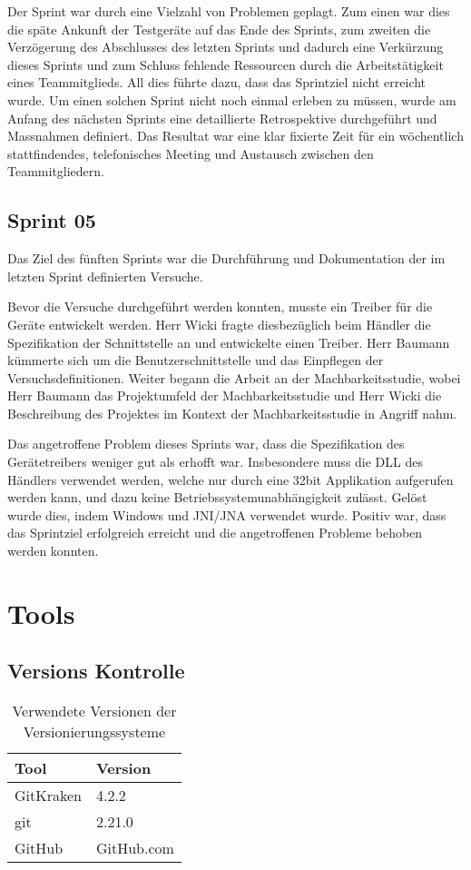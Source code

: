 Der Sprint war durch eine Vielzahl von Problemen geplagt. Zum einen war dies die späte Ankunft der Testgeräte auf das Ende des Sprints, zum zweiten die Verzögerung des Abschlusses des letzten Sprints und dadurch eine Verkürzung dieses Sprints und zum Schluss fehlende Ressourcen durch die Arbeitstätigkeit eines Teammitglieds. All dies führte dazu, dass das Sprintziel nicht erreicht wurde. Um einen solchen Sprint nicht noch einmal erleben zu müssen, wurde am Anfang des nächsten Sprints eine detaillierte Retrospektive durchgeführt und Massnahmen definiert. Das Resultat war eine klar fixierte Zeit für ein wöchentlich stattfindendes, telefonisches Meeting und Austausch zwischen den Teammitgliedern.

\subsection{Sprint 05}
Das Ziel des fünften Sprints war die Durchführung und Dokumentation der im letzten Sprint definierten Versuche.

Bevor die Versuche durchgeführt werden konnten, musste ein Treiber für die Geräte entwickelt werden. Herr Wicki fragte diesbezüglich beim Händler die Spezifikation der Schnittstelle an und entwickelte einen Treiber. Herr Baumann kümmerte sich um die Benutzerschnittstelle und das Einpflegen der Versuchsdefinitionen. Weiter begann die Arbeit an der Machbarkeitsstudie, wobei Herr Baumann das Projektumfeld der Machbarkeitsstudie und Herr Wicki die Beschreibung des Projektes im Kontext der Machbarkeitsstudie in Angriff nahm.

Das angetroffene Problem dieses Sprints war, dass die Spezifikation des Gerätetreibers weniger gut als erhofft war. Insbesondere muss die DLL des Händlers verwendet werden, welche nur durch eine 32bit Applikation aufgerufen werden kann, und dazu keine Betriebssystemunabhängigkeit zulässt. Gelöst wurde dies, indem Windows und JNI/JNA verwendet wurde. Positiv war, dass das Sprintziel erfolgreich erreicht und die angetroffenen Probleme behoben werden konnten.

\newpage

\section{Tools}
\label{sec:Tools}

\subsection{Versions Kontrolle}
\begin{table}[h!]
	\begin{tabular}{p{} p{}}
		\hline
		\textbf{Tool} & \textbf{Version} \\
		\hline
		GitKraken & 4.2.2 \\
		\hline
		git & 2.21.0 \\
		\hline
		GitHub & GitHub.com \\
		\hline
	\end{tabular}
	\caption{Verwendete Versionen der Versionierungssysteme}
\end{table}

